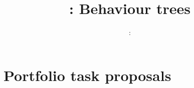 \usepackage{../../beamerthemeFalmouthGamesAcademy}
\usepackage{multimedia}
\graphicspath{ {../../} }


\usepackage[normalem]{ulem}
\usepackage{wasysym}

\usepackage{pdfpages}

\usetikzlibrary{arrows,automata}

\usepackage{qtree}




\title{\sessionnumber: Behaviour trees}
\subtitle{\modulecode: \moduletitle}

\frame{\titlepage} 





\part{Portfolio task proposals}
\frame{\partpage}


